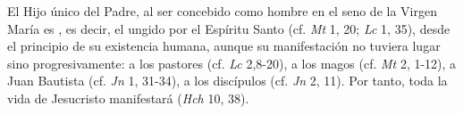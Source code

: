 	 El Hijo único del Padre, al ser concebido como hombre en el seno de la Virgen María es , es decir, el ungido por el Espíritu Santo (cf. \emph{Mt} 1, 20; \emph{Lc} 1, 35), desde el principio de su existencia humana, aunque su manifestación no tuviera lugar sino progresivamente: a los pastores (cf. \emph{Lc} 2,8-20), a los magos (cf. \emph{Mt} 2, 1-12), a Juan Bautista (cf. \emph{Jn} 1, 31-34), a los discípulos (cf. \emph{Jn} 2, 11). Por tanto, toda la vida de Jesucristo manifestará  (\emph{Hch} 10, 38).